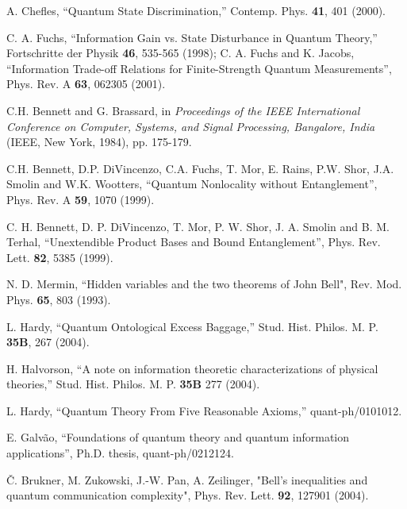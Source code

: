 \documentclass[pra,twocolumn,nofootinbib,showpacs]{revtex4}
\begin{document}
\begin{thebibliography}{99}
 A. Chefles, ``Quantum State Discrimination,''
Contemp. Phys. \textbf{41}, 401 (2000).

 C. A. Fuchs, ``Information Gain vs. State
Disturbance in Quantum Theory,'' Fortschritte der Physik \textbf{46},
535-565 (1998); C. A. Fuchs and K. Jacobs, ``Information Trade-off Relations
for Finite-Strength Quantum Measurements'', Phys. Rev. A \textbf{63}, 062305
(2001).

 C.H. Bennett and G. Brassard, in \textit{Proceedings of the
IEEE International Conference on Computer, Systems, and Signal Processing,
Bangalore, India} (IEEE, New York, 1984), pp. 175-179.

 C.H. Bennett, D.P. DiVincenzo, C.A. Fuchs, T.
Mor, E. Rains, P.W. Shor, J.A. Smolin and W.K. Wootters, ``Quantum
Nonlocality without Entanglement'', Phys. Rev. A \textbf{59}, 1070 (1999).

 C. H. Bennett, D. P. DiVincenzo, T. Mor, P. W. Shor, J. A.
Smolin and B. M. Terhal, ``Unextendible Product Bases and Bound
Entanglement'', Phys. Rev. Lett. \textbf{82}, 5385 (1999).

 N. D. Mermin, ``Hidden variables and the two theorems of
John Bell", Rev. Mod. Phys. \textbf{65}, 803 (1993).

 L. Hardy, ``Quantum Ontological Excess Baggage,''
Stud. Hist. Philos. M. P. \textbf{35B}, 267 (2004).

 H. Halvorson, ``A note on information theoretic
characterizations of physical theories,'' Stud. Hist. Philos. M.
P. \textbf{35B} 277 (2004).

 L. Hardy, ``Quantum Theory From Five Reasonable
Axioms,'' quant-ph/0101012.

 E. Galv\~{a}o, ``Foundations of quantum theory and quantum
information applications'', Ph.D. thesis, quant-ph/0212124.

 \v{C}. Brukner, M. Zukowski, J.-W. Pan, A. Zeilinger,
"Bell's inequalities and quantum communication complexity", Phys.
Rev. Lett. \textbf{92}, 127901 (2004).




\end{thebibliography}
\end{document}

